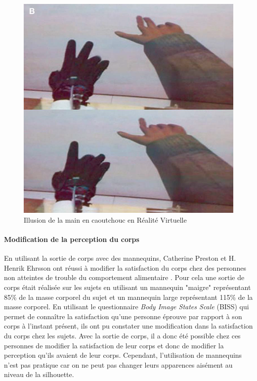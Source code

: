 \begin{figure}[!h]
   	\centerline{\includegraphics[scale=0.4]{images/biblio/rhiRV}}
   	\caption{\label{fig3} Illusion de la main en caoutchouc en Réalité Virtuelle \cite{sl08}}
\end{figure}


\paragraph{Modification de la perception du corps}

En utilisant la sortie de corps avec des mannequins, Catherine Preston et H. Henrik Ehrsson ont réussi à modifier la satisfaction du corps chez des personnes non atteintes de trouble du comportement alimentaire \cite{pr14}. Pour cela une sortie de corps était réalisée sur les sujets en utilisant un mannequin "maigre" représentant 85\% de la masse corporel du sujet et un mannequin large représentant 115\% de la masse corporel. En utilisant le questionnaire \emph{Body Image States Scale} (BISS) \cite{ca02} qui permet de connaître la satisfaction qu'une personne éprouve par rapport à son corps à l'instant présent, ils ont pu constater une modification dans la satisfaction du corps chez les sujets. Avec la sortie de corps, il a donc été possible chez ces personnes de modifier la satisfaction de leur corps et donc de modifier la perception qu'ils avaient de leur corps. Cependant, l'utilisation de mannequins n'est pas pratique car on ne peut pas changer leurs apparences aisément au niveau de la silhouette. 

